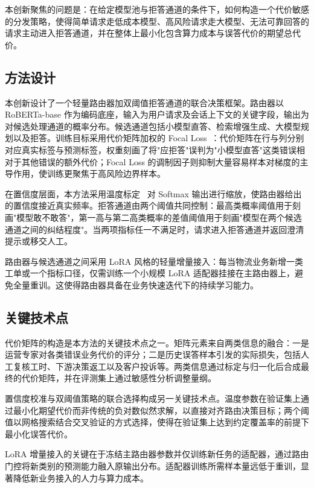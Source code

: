 本创新聚焦的问题是：在给定模型池与拒答通道的条件下，如何构造一个代价敏感的分发策略，使得简单请求走低成本模型、高风险请求走大模型、无法可靠回答的请求主动进入拒答通道，并在整体上最小化包含算力成本与误答代价的期望总代价。

\subsection{方法设计}

本创新设计了一个轻量路由器加双阈值拒答通道的联合决策框架。路由器以 RoBERTa-base 作为编码底座，输入为用户请求及会话上下文的关键字段，输出为对候选处理通道的概率分布。候选通道包括小模型直答、检索增强生成、大模型规划以及拒答。训练目标采用代价矩阵加权的 Focal Loss~\cite{focalloss}：代价矩阵在行与列分别对应真实标签与预测标签，权重刻画了将"应拒答"误判为"小模型直答"这类错误相对于其他错误的额外代价；Focal Loss 的调制因子则抑制大量容易样本对梯度的主导作用，使训练更聚焦于高风险边界样本。

在置信度层面，本方法采用温度标定~\cite{tempscaling} 对 Softmax 输出进行缩放，使路由器给出的置信度接近真实频率。拒答通道由两个阈值共同控制：最高类概率阈值用于刻画"模型敢不敢答"，第一高与第二高类概率的差值阈值用于刻画"模型在两个候选通道之间的纠结程度"。当两项指标任一不满足时，请求进入拒答通道并返回澄清提示或移交人工。

路由器与候选通道之间采用 LoRA 风格的轻量增量接入：每当物流业务新增一类工单或一个指标口径，仅需训练一个小规模 LoRA 适配器挂接在主路由器上，避免全量重训。这使得路由器具备在业务快速迭代下的持续学习能力。

\subsection{关键技术点}

代价矩阵的构造是本方法的关键技术点之一。矩阵元素来自两类信息的融合：一是运营专家对各类错误业务代价的评分；二是历史误答样本引发的实际损失，包括人工复核工时、下游决策返工以及客户投诉等。两类信息通过标定与归一化后合成最终的代价矩阵，并在评测集上通过敏感性分析调整量纲。

置信度校准与双阈值策略的联合选择构成另一关键技术点。温度参数在验证集上通过最小化期望代价而非传统的负对数似然求解，以直接对齐路由决策目标；两个阈值以网格搜索结合交叉验证的方式选择，使得在验证集上达到约定覆盖率的前提下最小化误答代价。

LoRA 增量接入的关键在于冻结主路由器参数并仅训练新任务的适配器，通过路由门控将新类别的预测能力融入原输出分布。适配器训练所需样本量远低于重训，显著降低新业务接入的人力与算力成本。


